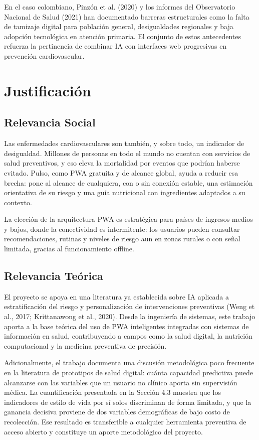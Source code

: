\documentclass[12pt,letterpaper]{article}
\begin{document}
En el caso colombiano, Pinzón et al. (2020) y los informes del Observatorio
Nacional de Salud (2021) han documentado barreras estructurales como la falta de
tamizaje digital para población general, desigualdades regionales y baja adopción
tecnológica en atención primaria. El conjunto de estos antecedentes refuerza la
pertinencia de combinar IA con interfaces web progresivas en prevención
cardiovascular.

\newpage

\section{Justificación}

\subsection{Relevancia Social}

Las enfermedades cardiovasculares son también, y sobre todo, un indicador de
desigualdad. Millones de personas en todo el mundo no cuentan con servicios de
salud preventivos, y eso eleva la mortalidad por eventos que podrían haberse
evitado. Pulso, como PWA gratuita y de alcance global, ayuda a reducir esa
brecha: pone al alcance de cualquiera, con o sin conexión estable, una estimación
orientativa de su riesgo y una guía nutricional con ingredientes adaptados a su
contexto.

La elección de la arquitectura PWA es estratégica para países de ingresos medios
y bajos, donde la conectividad es intermitente: los usuarios pueden consultar
recomendaciones, rutinas y niveles de riesgo aun en zonas rurales o con señal
limitada, gracias al funcionamiento offline.

\subsection{Relevancia Teórica}

El proyecto se apoya en una literatura ya establecida sobre IA aplicada a
estratificación del riesgo y personalización de intervenciones preventivas (Weng
et al., 2017; Krittanawong et al., 2020). Desde la ingeniería de sistemas, este
trabajo aporta a la base teórica del uso de PWA inteligentes integradas con
sistemas de información en salud, contribuyendo a campos como la salud digital,
la nutrición computacional y la medicina preventiva de precisión.

Adicionalmente, el trabajo documenta una discusión metodológica poco frecuente en
la literatura de prototipos de salud digital: cuánta capacidad predictiva puede
alcanzarse con las variables que un usuario no clínico aporta sin supervisión
médica. La cuantificación presentada en la Sección 4.3 muestra que los
indicadores de estilo de vida por sí solos discriminan de forma limitada, y que
la ganancia decisiva proviene de dos variables demográficas de bajo costo de
recolección. Ese resultado es transferible a cualquier herramienta preventiva de
acceso abierto y constituye un aporte metodológico del proyecto.
\end{document}

